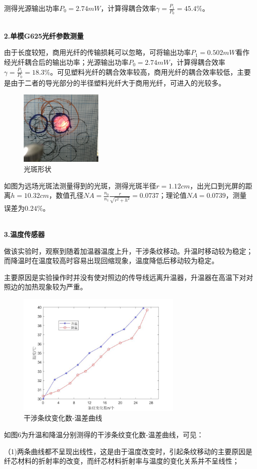 \documentclass[UTF8]{ctexart}
\begin{document}
\begin{multicols}{2}
测得光源输出功率$P_0=2.74mW$，计算得耦合效率$\gamma=\frac{P_1}{P_0}=45.4\%$。

~\\
\noindent\textbf{2.单模G625光纤参数测量}

由于长度较短，商用光纤的传输损耗可以忽略，可将输出功率$P_1=0.502mW$看作经光纤耦合后的输出功率；光源输出功率$P_0=2.74mW$，计算得耦合效率$\gamma=\frac{P_1}{P_0}=18.3\%$。可见塑料光纤的耦合效率较高，商用光纤的耦合效率较低，主要是由于二者的导光部分的半径塑料光纤大于商用光纤，可进入的光较多。
\begin{figure}[H]
\centering
\includegraphics[width=4cm]{single}
\caption{光斑形状}
\end{figure}
如图为远场光斑法测量得到的光斑，测得光斑半径$r=1.12cm$，出光口到光屏的距离$h=10.32cm$，数值孔径$NA=\frac{n_0}{n_1}\frac{r}{\sqrt{r^2+h^2}}=0.0737$；理论值$NA=0.0739$，测量误差为$0.24\%$。

~\\
\noindent\textbf{3.温度传感器}

做该实验时，观察到随着加温器温度上升，干涉条纹移动。升温时移动较为稳定；而降温时在温度较高时容易出现回缩现象，温度降低后移动较为稳定。

主要原因是实验操作时并没有使对照边的传导线远离升温器，升温器在高温下对对照边的加热现象较为严重。
\begin{figure}[H]
\centering
\includegraphics[width=8cm]{thermal}
\caption{干涉条纹变化数-温差曲线}
\end{figure}
如图6为升温和降温分别测得的干涉条纹变化数-温差曲线，可见：

（1)两条曲线都不呈现出线性，这是由于温度改变时，引起条纹移动的主要原因是纤芯材料的折射率的改变，而纤芯材料折射率与温度的变化关系并不呈线性；


\end{multicols}
\end{document}
